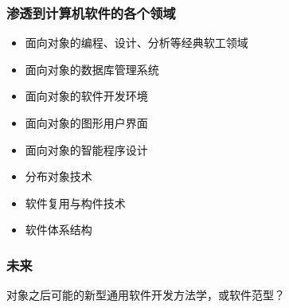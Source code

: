 \documentclass[compress]{beamer}
\begin{document}
\begin{frame}
\frametitle{渗透到计算机软件的各个领域}
\begin{itemize}
\item 面向对象的编程、设计、分析等经典软工领域
\item 面向对象的数据库管理系统
\item 面向对象的软件开发环境
\item 面向对象的图形用户界面
\item 面向对象的智能程序设计
\item 分布对象技术
\item 软件复用与构件技术
\item 软件体系结构
\end{itemize}
\end{frame}

\begin{frame}
\frametitle{未来}
对象之后可能的新型通用软件开发方法学，或软件范型？
\end{frame}
\end{document}

